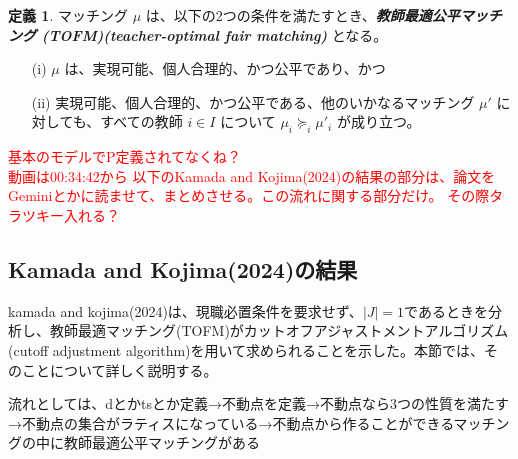 \documentclass[12pt, a4paper]{article}
\theoremstyle{definition}
\newtheorem{defn}{定義}
\theoremstyle{remark}
\theoremstyle{plain}
\begin{document}
  



\begin{defn}
マッチング $\mu$ は、以下の2つの条件を満たすとき、\textbf{\textit{教師最適公平マッチング (TOFM)(teacher-optimal fair matching) }} となる。
\begin{itemize}
    \item[(i)] $\mu$ は、実現可能、個人合理的、かつ公平であり、かつ
    \item[(ii)] 実現可能、個人合理的、かつ公平である、他のいかなるマッチング $\mu'$ に対しても、すべての教師 $i \in I$ について $\mu_i \succeq_i \mu'_i$ が成り立つ。
\end{itemize}
\end{defn}




\textcolor{red}{基本のモデルでP定義されてなくね？\\
  動画は00:34:42から 以下のKamada and Kojima(2024)の結果の部分は、論文をGeminiとかに読ませて、まとめさせる。この流れに関する部分だけ。 その際タラツキー入れる？}

\subsection{Kamada and Kojima(2024)の結果}
kamada and kojima(2024)は、現職必置条件を要求せず、$|J| = 1$であるときを分析し、教師最適マッチング(TOFM)がカットオフアジャストメントアルゴリズム(cutoff adjustment algorithm)を用いて求められることを示した。本節では、そのことについて詳しく説明する。



流れとしては、dとかtsとか定義→不動点を定義→不動点なら3つの性質を満たす→不動点の集合がラティスになっている→不動点から作ることができるマッチングの中に教師最適公平マッチングがある
\end{document}
